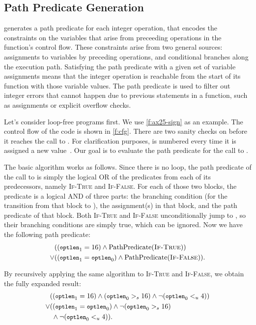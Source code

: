 \subsection{Path Predicate Generation}
\label{s:gen:path}

\sys generates a path predicate for each integer operation, that encodes
the constraints on the variables that arise from preceeding operations
in the function's control flow.  These constraints arise from two general
sources: assignments to variables by preceding operations, and conditional
branches along the execution path.  Satisfying the path predicate with
a given set of variable assignments means that the integer operation is
reachable from the start of its function with those variable values.
The path predicate is used to filter out integer errors that cannot
happen due to previous statements in a function, such as assignments or
explicit overflow checks.

Let's consider loop-free programs first.
%
We use \autoref{f:ax25-sign} as an example.  The control flow of
the code is shown in \autoref{f:cfg}.  There are two sanity checks
on  before it reaches the call to .
For clarification purposes,  is numbered every time it is
assigned a new value~\cite[\chapterautorefname~8.11]{whale}.  Our
goal is to evaluate the path predicate for the call to .

The basic algorithm works as follows.  Since there is no loop, the
path predicate of the call to  is simply the
logical OR of the predicates from each of its predecessors, namely
\textsc{If-True} and \textsc{If-False}.  For each of those two blocks,
the predicate is a logical AND of three parts: the branching condition
(for the transition from that block to ), the
assignment(s) in that block, and the path predicate
of that block.  Both \textsc{If-True} and \textsc{If-False}
unconditionally jump to , so their branching
conditions are simply true, which can be ignored.  Now we have the
following path predicate:
\newcommand{\optlen}{{\small \texttt{optlen}}}
\newcommand{\pc}{\textrm{PathPredicate}}
%
\begin{align*}
& ((\optlen_1 = 16) \land \pc(\textsc{If-True})) \\
\lor & ((\optlen_1 = \optlen_0) \land \pc(\textsc{If-False})).
\end{align*}

By recursively applying the same algorithm to \textsc{If-True} and
\textsc{If-False}, we obtain the fully expanded result:
%
\begin{align*}
& ((\optlen_1 = 16) \land (\optlen_0 >_s 16)
    \land \neg(\optlen_0 <_u 4)) \\
\lor & ((\optlen_1 = \optlen_0) \land \neg(\optlen_0 >_s 16) \\
     & \; \land \neg(\optlen_0 <_u 4)).
\end{align*}

